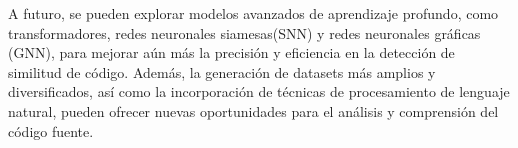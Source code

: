 \begin{recomendations}
     A futuro, se pueden explorar modelos avanzados de aprendizaje profundo, como transformadores, redes neuronales siamesas(SNN) y redes neuronales gráficas (GNN), para mejorar aún más la precisión y eficiencia en la detección de similitud de código. Además, la generación de datasets más amplios y diversificados, así como la incorporación de técnicas de procesamiento de lenguaje natural, pueden ofrecer nuevas oportunidades para el análisis y comprensión del código fuente.

\end{recomendations}
